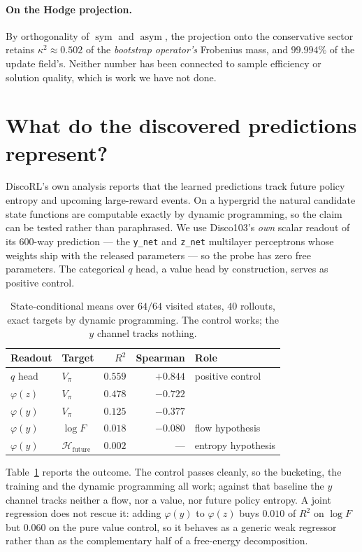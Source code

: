 \documentclass[11pt]{article}
\theoremstyle{remark}
\newcommand{\sym}{\operatorname{sym}}
\newcommand{\asym}{\operatorname{asym}}
\begin{document}
\paragraph{On the Hodge projection.} By orthogonality of $\sym$ and $\asym$,
the projection onto the conservative sector retains $\kappa^2 \approx 0.502$ of
the \emph{bootstrap operator's} Frobenius mass, and $99.994\%$ of the update
field's. Neither number has been connected to sample efficiency or solution
quality, which is work we have not done.

\section{What do the discovered predictions represent?}

DiscoRL's own analysis reports that the learned predictions track future policy
entropy and upcoming large-reward events. On a hypergrid the natural candidate
state functions are computable exactly by dynamic programming, so the claim can
be tested rather than paraphrased. We use Disco103's \emph{own} scalar readout of
its $600$-way prediction --- the \texttt{y\_net} and \texttt{z\_net} multilayer
perceptrons whose weights ship with the released parameters --- so the probe has
zero free parameters. The categorical $q$ head, a value head by construction,
serves as positive control.

\begin{table}[t]
\centering
\begin{tabular}{llrrl}
\toprule
Readout & Target & $R^2$ & Spearman & Role \\
\midrule
$q$ head    & $V_\pi$   & $0.559$ & $+0.844$ & positive control \\
$\varphi(z)$ & $V_\pi$   & $0.478$ & $-0.722$ & \\
$\varphi(y)$ & $V_\pi$   & $0.125$ & $-0.377$ & \\
$\varphi(y)$ & $\log F$  & $0.018$ & $-0.080$ & flow hypothesis \\
$\varphi(y)$ & $\mathcal H_{\text{future}}$ & $0.002$ & --- & entropy hypothesis \\
\bottomrule
\end{tabular}
\caption{State-conditional means over $64/64$ visited states, $40$ rollouts,
exact targets by dynamic programming. The control works; the $y$ channel tracks
nothing.}
\label{tab:probe}
\end{table}

Table~\ref{tab:probe} reports the outcome. The control passes cleanly, so the
bucketing, the training and the dynamic programming all work; against that
baseline the $y$ channel tracks neither a flow, nor a value, nor future policy
entropy. A joint regression does not rescue it: adding $\varphi(y)$ to
$\varphi(z)$ buys $0.010$ of $R^2$ on $\log F$ but $0.060$ on the pure value
control, so it behaves as a generic weak regressor rather than as the
complementary half of a free-energy decomposition.
\end{document}
